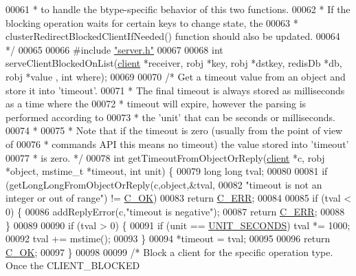 \begin{DoxyCode}
00061 \textcolor{comment}{ * to handle the btype-specific behavior of this two functions.}
00062 \textcolor{comment}{ * If the blocking operation waits for certain keys to change state, the}
00063 \textcolor{comment}{ * clusterRedirectBlockedClientIfNeeded() function should also be updated.}
00064 \textcolor{comment}{ */}
00065 
00066 \textcolor{preprocessor}{#}\textcolor{preprocessor}{include} \hyperlink{server_8h}{"server.h"}
00067 
00068 \textcolor{keywordtype}{int} serveClientBlockedOnList(\hyperlink{structclient}{client} *receiver, robj *key, robj *dstkey, redisDb *db, robj *value
      , \textcolor{keywordtype}{int} where);
00069 
00070 \textcolor{comment}{/* Get a timeout value from an object and store it into 'timeout'.}
00071 \textcolor{comment}{ * The final timeout is always stored as milliseconds as a time where the}
00072 \textcolor{comment}{ * timeout will expire, however the parsing is performed according to}
00073 \textcolor{comment}{ * the 'unit' that can be seconds or milliseconds.}
00074 \textcolor{comment}{ *}
00075 \textcolor{comment}{ * Note that if the timeout is zero (usually from the point of view of}
00076 \textcolor{comment}{ * commands API this means no timeout) the value stored into 'timeout'}
00077 \textcolor{comment}{ * is zero. */}
00078 \textcolor{keywordtype}{int} getTimeoutFromObjectOrReply(\hyperlink{structclient}{client} *c, robj *object, mstime\_t *timeout, \textcolor{keywordtype}{int} unit) \{
00079     \textcolor{keywordtype}{long} \textcolor{keywordtype}{long} tval;
00080 
00081     \textcolor{keywordflow}{if} (getLongLongFromObjectOrReply(c,object,&tval,
00082         \textcolor{stringliteral}{"timeout is not an integer or out of range"}) != \hyperlink{server_8h_a303769ef1065076e68731584e758d3e1}{C\_OK})
00083         \textcolor{keywordflow}{return} \hyperlink{server_8h_af98ac28d5f4d23d7ed5985188e6fb7d1}{C\_ERR};
00084 
00085     \textcolor{keywordflow}{if} (tval < 0) \{
00086         addReplyError(c,\textcolor{stringliteral}{"timeout is negative"});
00087         \textcolor{keywordflow}{return} \hyperlink{server_8h_af98ac28d5f4d23d7ed5985188e6fb7d1}{C\_ERR};
00088     \}
00089 
00090     \textcolor{keywordflow}{if} (tval > 0) \{
00091         \textcolor{keywordflow}{if} (unit == \hyperlink{server_8h_a8553b0a6c729b15594731a0d37b4fb0d}{UNIT\_SECONDS}) tval *= 1000;
00092         tval += mstime();
00093     \}
00094     *timeout = tval;
00095 
00096     \textcolor{keywordflow}{return} \hyperlink{server_8h_a303769ef1065076e68731584e758d3e1}{C\_OK};
00097 \}
00098 
00099 \textcolor{comment}{/* Block a client for the specific operation type. Once the CLIENT\_BLOCKED}

\end{DoxyCode}
